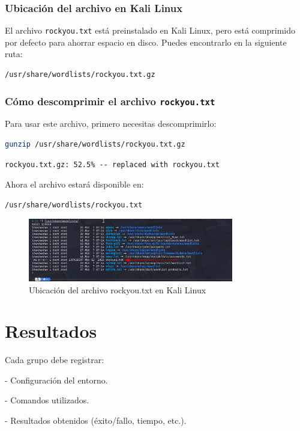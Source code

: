 \documentclass[12pt,a4paper]{article}
\begin{document}
\subsubsection*{Ubicación del archivo en Kali Linux}
El archivo \texttt{rockyou.txt} está preinstalado en Kali Linux, pero está comprimido por defecto para ahorrar espacio en disco. Puedes encontrarlo en la siguiente ruta:
\begin{verbatim}
/usr/share/wordlists/rockyou.txt.gz
\end{verbatim}

\subsubsection*{Cómo descomprimir el archivo \texttt{rockyou.txt}}
Para usar este archivo, primero necesitas descomprimirlo:
\begin{lstlisting}[language=bash]
gunzip /usr/share/wordlists/rockyou.txt.gz
\end{lstlisting}
\begin{verbatim}
rockyou.txt.gz: 52.5% -- replaced with rockyou.txt
\end{verbatim}
Ahora el archivo estará disponible en:
\begin{verbatim}
/usr/share/wordlists/rockyou.txt
\end{verbatim}

\begin{figure}[htbp]
    \centering
    \includegraphics[width=0.8\textwidth]{rockyou.png}
    \caption{Ubicación del archivo rockyou.txt en Kali Linux}
    \label{fig:rockyou}
\end{figure}

\section*{Resultados}
Cada grupo debe registrar:

    
- Configuración del entorno.
    
- Comandos utilizados.
    
- Resultados obtenidos (éxito/fallo, tiempo, etc.).
    
\end{document}
